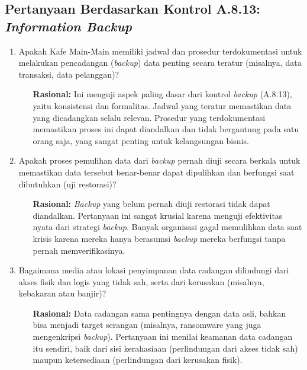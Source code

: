 \documentclass[12pt, a4paper]{report}
\begin{document}
\subsection{Pertanyaan Berdasarkan Kontrol A.8.13: \textit{Information Backup}}
\begin{enumerate}
    \item Apakah Kafe Main-Main memiliki jadwal dan prosedur terdokumentasi untuk melakukan pencadangan (\textit{backup}) data penting secara teratur (misalnya, data transaksi, data pelanggan)?
    \begin{itemize}
        \item[\textbf{Rasional:}] Ini menguji aspek paling dasar dari kontrol \textit{backup} (A.8.13), yaitu konsistensi dan formalitas. Jadwal yang teratur memastikan data yang dicadangkan selalu relevan. Prosedur yang terdokumentasi memastikan proses ini dapat diandalkan dan tidak bergantung pada satu orang saja, yang sangat penting untuk kelangsungan bisnis.
    \end{itemize}

    \item Apakah proses pemulihan data dari \textit{backup} pernah diuji secara berkala untuk memastikan data tersebut benar-benar dapat dipulihkan dan berfungsi saat dibutuhkan (uji restorasi)?
    \begin{itemize}
        \item[\textbf{Rasional:}] \textit{Backup} yang belum pernah diuji restorasi tidak dapat diandalkan. Pertanyaan ini sangat krusial karena menguji efektivitas nyata dari strategi \textit{backup}. Banyak organisasi gagal memulihkan data saat krisis karena mereka hanya berasumsi \textit{backup} mereka berfungsi tanpa pernah memverifikasinya.
    \end{itemize}
    
    \item Bagaimana media atau lokasi penyimpanan data cadangan dilindungi dari akses fisik dan logis yang tidak sah, serta dari kerusakan (misalnya, kebakaran atau banjir)? \citep{sari2023backup}
    \begin{itemize}
        \item[\textbf{Rasional:}] Data cadangan sama pentingnya dengan data asli, bahkan bisa menjadi target serangan (misalnya, ransomware yang juga mengenkripsi \textit{backup}). Pertanyaan ini menilai keamanan data cadangan itu sendiri, baik dari sisi kerahasiaan (perlindungan dari akses tidak sah) maupun ketersediaan (perlindungan dari kerusakan fisik).
    \end{itemize}
\end{enumerate}
\end{document}
